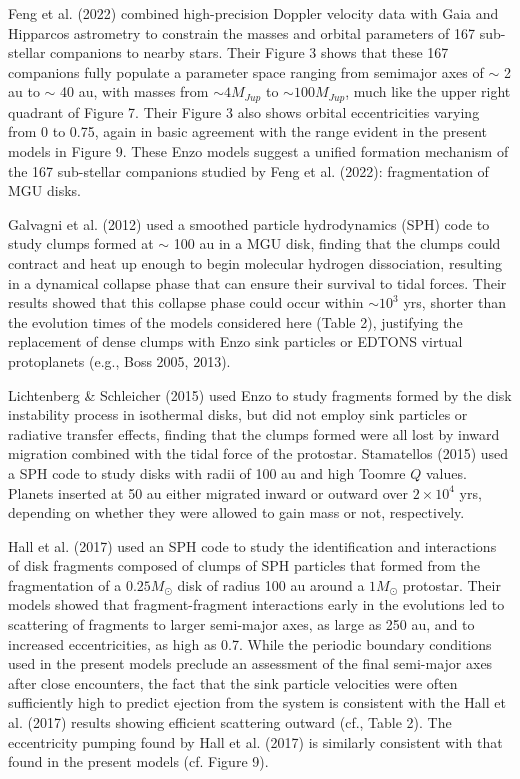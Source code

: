 \documentclass[12pt,preprint]{aastex}
\begin{document}
 Feng et al. (2022) combined high-precision Doppler velocity data with Gaia and Hipparcos astrometry 
to constrain the masses and orbital parameters of 167 sub-stellar companions to nearby stars. Their
Figure 3 shows that these 167 companions fully populate a parameter space ranging from semimajor
axes of $\sim$ 2 au to $\sim$ 40 au, with masses from $ \sim 4 M_{Jup}$ to  $ \sim 100 M_{Jup}$, 
much like the upper right quadrant of Figure 7. Their Figure 3 also shows orbital eccentricities varying
from 0 to 0.75, again in basic agreement with the range evident in the present models in Figure 9.
These Enzo models suggest a unified formation mechanism of the 167 sub-stellar companions
studied by Feng et al. (2022): fragmentation of MGU disks.

 Galvagni et al. (2012) used a smoothed particle hydrodynamics (SPH) code to study clumps
formed at $\sim$ 100 au in a MGU disk, finding that the clumps could contract and heat up
enough to begin molecular hydrogen dissociation, resulting in a dynamical collapse phase
that can ensure their survival to tidal forces. Their results showed that this collapse phase
could occur within $\sim 10^3$ yrs, shorter than the evolution times of the models considered 
here (Table 2), justifying the replacement of dense clumps with Enzo sink particles or  
EDTONS virtual protoplanets (e.g., Boss 2005, 2013).

 Lichtenberg \& Schleicher (2015) used Enzo to study fragments formed by the disk instability process in 
isothermal disks, but did not employ sink particles or radiative transfer effects, finding that the
clumps formed were all lost by inward migration combined with the tidal force of the protostar.
Stamatellos  (2015) used a SPH code to study disks with radii of 100 au and high Toomre $Q$
values. Planets inserted at 50 au either migrated inward or outward over $2 \times 10^4$ yrs, depending
on whether they were allowed to gain mass or not, respectively. 

 Hall et al. (2017) used an SPH code to study the identification and interactions of disk fragments
composed of clumps of SPH particles that formed from the fragmentation of a $0.25 M_\odot$ disk of 
radius 100 au around a $1 M_\odot$ protostar. Their models showed that fragment-fragment interactions
early in the evolutions led to scattering of fragments to larger semi-major axes, as large as 250 au, and
to increased eccentricities, as high as 0.7. While the periodic boundary conditions used in the present
models preclude an assessment of the final semi-major axes after close encounters, the fact that
the sink particle velocities were often sufficiently high to predict ejection from the system is consistent
with the Hall et al. (2017) results showing efficient scattering outward (cf., Table 2). The eccentricity
pumping found by Hall et al. (2017) is similarly consistent with that found in the present models (cf. Figure 9).
\end{document}
